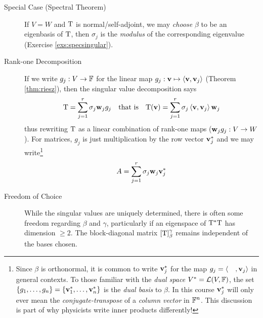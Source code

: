 \begin{description}
  \item[Special Case (Spectral Theorem)] If $V=W$ and $\mathrm{T}$ is normal/self-adjoint, we may \emph{choose} $\beta$ to be an eigenbasis of $\mathrm{T}$, then $\sigma_j$ is the \emph{modulus} of the corresponding eigenvalue (Exercise \ref{exs:specsingular}).
  \item[Rank-one Decomposition] If we write $g_j:V\to\mathbb{F}$ for the linear map $g_j:{\mathbf{v}}\mapsto \left\langle {\mathbf{v}},{\mathbf{v}}_j\right\rangle$ (Theorem \ref{thm:riesz}), then the singular value decomposition says
  \[
  	\mathrm{T}=\sum_{j=1}^r \sigma_j{\mathbf{w}}_jg_j
  	\quad \text{that is}\quad 
  	\mathrm{T}({\mathbf{v}})=\sum_{j=1}^r \sigma_j\left\langle {\mathbf{v}},{\mathbf{v}}_j\right\rangle{\mathbf{w}}_j
  \]
  thus rewriting $\mathrm{T}$ as a linear combination of rank-one maps (${\mathbf{w}}_jg_j:V\to W$). For matrices, $g_j$ is just multiplication by the row vector ${\mathbf{v}}_j^*$ and we may write\footnote{%
  	Since $\beta$ is orthonormal, it is common to write ${\mathbf{v}}_j^*$ for the map $g_j=\langle\quad,{\mathbf{v}}_j\rangle$ in general contexts. To those familiar with the \emph{dual space} $V^*=\mathcal{L}(V,\mathbb{F})$, the set $\{g_1,\ldots,g_n\}=\{{\mathbf{v}}_1^*,\ldots,{\mathbf{v}}_n^*\}$ is the \emph{dual basis} to $\beta$. In this course ${\mathbf{v}}_j^*$ will only ever mean the \emph{conjugate-transpose} of a \emph{column vector} in $\mathbb{F}^n$. This discussion is part of why physicists write inner products differently!%
 	}
	\[
		A=\sum_{j=1}^r\sigma_j{\mathbf{w}}_j{\mathbf{v}}_j^*
	\]
  \item[Freedom of Choice] While the singular values are uniquely determined, there is often some freedom regarding $\beta$ and $\gamma$, particularly if an eigenspace of $\mathrm{T}^*\mathrm{T}$ has dimension $\ge 2$. The block-diagonal matrix $[\mathrm{T}]_\beta^\gamma$ remains independent of the bases chosen.
\end{description}



